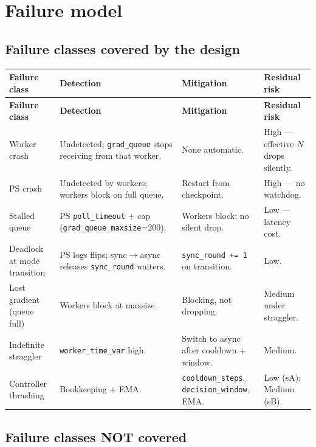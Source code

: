 \documentclass[11pt,a4paper]{article}
\begin{document}
\section{Failure model}

\subsection{Failure classes covered by the design}

{\footnotesize
\begin{longtable}{@{}L L L L@{}}
  \toprule
  \textbf{Failure class} & \textbf{Detection} & \textbf{Mitigation} & \textbf{Residual risk} \\
  \midrule
  \endfirsthead
  \toprule
  \textbf{Failure class} & \textbf{Detection} & \textbf{Mitigation} & \textbf{Residual risk} \\
  \midrule
  \endhead
  \bottomrule
  \endfoot
  Worker crash & Undetected; \texttt{grad\_queue} stops receiving from that worker. & None automatic. & High --- effective $N$ drops silently. \\
  PS crash & Undetected by workers; workers block on full queue. & Restart from checkpoint. & High --- no watchdog. \\
  Stalled queue & PS \texttt{poll\_timeout} + cap (\texttt{grad\_queue\_maxsize}=200). & Workers block; no silent drop. & Low --- latency cost. \\
  Deadlock at mode transition & PS logs flips; sync$\to$async releases \texttt{sync\_round} waiters. & \texttt{sync\_round += 1} on transition. & Low. \\
  Lost gradient (queue full) & Workers block at maxsize. & Blocking, not dropping. & Medium under straggler. \\
  Indefinite straggler & \texttt{worker\_time\_var} high. & Switch to async after cooldown + window. & Medium. \\
  Controller thrashing & Bookkeeping + EMA. & \texttt{cooldown\_steps}, \texttt{decision\_window}, EMA. & Low (sA); Medium (sB). \\
\end{longtable}
}

\subsection{Failure classes NOT covered}
\end{document}
